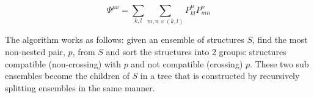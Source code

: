 \begin{equation}
\Psi^{\mu\nu} = \sum_{k,l} \sum_{m,n \times (k,l)} P^{\mu}_{kl}
P^{\nu}_{mn} 
\end{equation}

The algorithm works as follows: given an ensemble of structures $S$,
find the most non-nested pair, $p$, from $S$ and sort the structures
into 2 groups: structures compatible (non-crossing) with $p$ and not
compatible (crossing) $p$. These two sub ensembles become the children
of $S$ in a tree that is constructed by recursively splitting
ensembles in the same manner.
